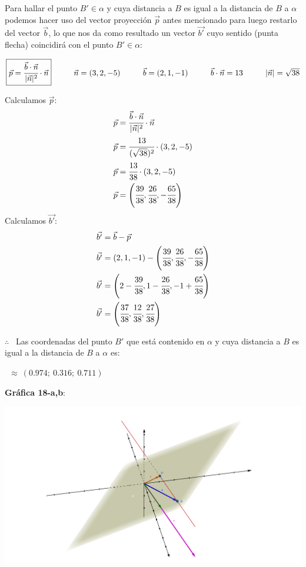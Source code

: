 \noindent Para hallar el punto $B' \in \alpha$ y cuya distancia a $B$ es igual a la distancia de $B$ a $\alpha$ podemos hacer uso del vector proyección $\vec{p}$ antes mencionado para luego restarlo del vector $\vec{b}$, lo que nos da como resultado un vector $\vec{b'}$ cuyo sentido (punta flecha) coincidirá con el punto $B' \in \alpha$:
\begin{center}
	$\boxed{\vec{p} = \cfrac{\vec{b} \cdot \vec{n}}{|\vec{n}|^2} \cdot \vec{n}} \hspace*{1cm}
		\vec{n}=(3, 2, -5)  \hspace*{1cm}
		\vec{b}=(2, 1, -1) \hspace*{1cm}
		\vec{b} \cdot \vec{n}  = 13 \hspace*{1cm}
		|\vec{n}|  = \sqrt{38}$
\end{center}
\begin{multicols}{2}
	\noindent Calculamos $\vec{p}$:
	\begin{align*}
		\vec{p} & = \cfrac{\vec{b} \cdot \vec{n}}{|\vec{n}|^2} \cdot \vec{n}       \\
		\vec{p} & = \cfrac{13}{(\sqrt{38})^2} \cdot (3, 2, -5)                     \\
		\vec{p} & = \cfrac{13}{38} \cdot (3, 2, -5)                                \\
		\vec{p} & = \left( \cfrac{39}{38}, \cfrac{26}{38}, -\cfrac{65}{38} \right) \\
	\end{align*}
	\noindent Calculamos $\vec{b'}$:
	\begin{align*}
		\vec{b'} & = \vec{b} - \vec{p}                                                           \\
		\vec{b'} & = (2, 1, -1) - \left( \cfrac{39}{38}, \cfrac{26}{38}, -\cfrac{65}{38} \right) \\
		\vec{b'} & = \left( 2 - \cfrac{39}{38}, 1 - \cfrac{26}{38}, -1 + \cfrac{65}{38} \right)  \\
		\vec{b'} & = \left( \cfrac{37}{38}, \cfrac{12}{38}, \cfrac{27}{38} \right)
	\end{align*}
\end{multicols}

\noindent $\therefore$ \ Las coordenadas del punto $B'$ que está contenido en $\alpha$ y cuya distancia a $B$ es igual a la distancia de $B$ a $\alpha$ es:

\ $\approx \ (0.974; \ 0.316;\ 0.711)$

\newpage
\noindent \textbf{Gráfica 18-a,b}:
\begin{center}
	\href{https://www.geogebra.org/3d/wrk3eabw}{\includegraphics[width=15cm, scale=1]{TP-MATEMATICA-EJ18AB.png}}
\end{center}

